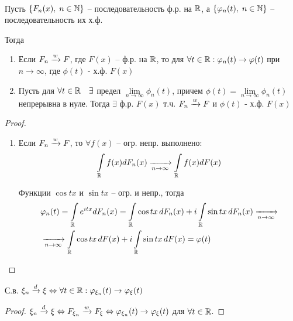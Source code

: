 \begin{theorem}[непрерывности]~

  Пусть $\{ F_n(x),\; n \in \mathbb{N} \}$ -- последовательность ф.р. на $\mathbb{R}$, 
  а $\{ \varphi_n(t),\; n \in \mathbb{N} \}$ -- последовательность их х.ф.

  Тогда
  \begin{enumerate}
    \item
      Если $F_n \xrightarrow{w} F$, где $F(x)$ -- ф.р. на $\mathbb{R}$, 
      то для $\forall t \in \mathbb{R}: \varphi_n(t) \to \varphi(t)$ при $n \to \infty$, 
      где $\phi(t)$ - х.ф. $F(x)$

    \item
      Пусть для $\forall t \in \mathbb{R} \quad \exists$ предел $\lim\limits_{n \to \infty} \phi_n (t)$,
      причем $\phi(t) = \lim\limits_{n \to \infty} \phi_n(t)$ непрерывна в нуле. 
      Тогда $\exists$ ф.р. $F(x)$ т.ч. $F_n \xrightarrow{w} F$ и $\phi(t)$ - х.ф. $F(x)$
  \end{enumerate}

  \begin{proof}
    \begin{enumerate}
      \item
        Если $F_n \xrightarrow{w} F$, то $\forall f(x)$ -- огр. непр. выполнено:
        \begin{align*}
          \int\limits_{\mathbb{R}} f(x) dF_n(x) \xrightarrow[n \to \infty]{} \int\limits_{\mathbb{R}} f(x) dF(x)
        \end{align*}

        Функции $\cos{tx}$ и $\sin{tx}$ -- огр. и непр., тогда 
        \begin{align*}
          &\varphi_n (t) = \int\limits_{\mathbb{R}} e^{i t x} dF_n(x) 
          = \int\limits_{\mathbb{R}} \cos{tx}\, dF_n(x) + i \int\limits_{\mathbb{R}} \sin{tx}\, dF_n(x)
          \xrightarrow[n \to \infty]{}\\
          &\xrightarrow[n \to \infty]{} \int\limits_{\mathbb{R}} \cos{tx}\, dF(x) 
          + i \int\limits_{\mathbb{R}} \sin{tx}\, dF(x) = \varphi(t)
        \end{align*}
    \end{enumerate}
  \end{proof}
\end{theorem}

\begin{corollary}
  С.в. $\xi_n \xrightarrow{d} \xi \Leftrightarrow \forall t \in \mathbb{R}:
  \varphi_{\xi_n} (t) \to \varphi_\xi (t)$

  \begin{proof}
    $\xi_n \xrightarrow{d} \xi \Leftrightarrow F_{\xi_n} \xrightarrow{w} F_{\xi} \Leftrightarrow 
    \varphi_{\xi_n} (t) \to \varphi_\xi (t)$ для $\forall t \in \mathbb{R}$.
  \end{proof}
\end{corollary}

